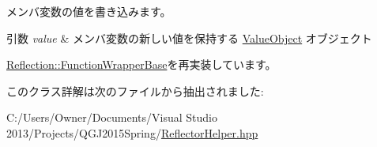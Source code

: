 メンバ変数の値を書き込みます。


\begin{DoxyParams}{引数}
{\em value} & メンバ変数の新しい値を保持する \hyperlink{class_reflection_1_1_value_object}{Value\+Object} オブジェクト\\
\hline
\end{DoxyParams}


\hyperlink{class_reflection_1_1_function_wrapper_base_a36995d6466e10a377669082eb9e3daae}{Reflection\+::\+Function\+Wrapper\+Base}を再実装しています。



このクラス詳解は次のファイルから抽出されました\+:\begin{DoxyCompactItemize}
\item 
C\+:/\+Users/\+Owner/\+Documents/\+Visual Studio 2013/\+Projects/\+Q\+G\+J2015\+Spring/\hyperlink{_reflector_helper_8hpp}{Reflector\+Helper.\+hpp}\end{DoxyCompactItemize}
